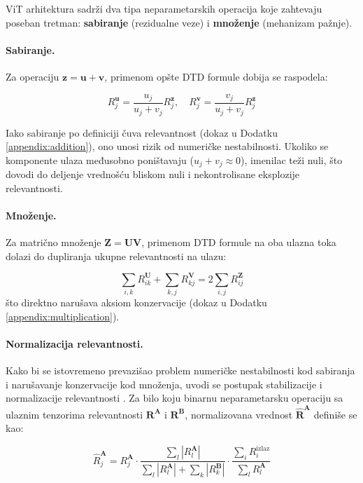 ViT arhitektura sadrži dva tipa neparametarskih operacija koje zahtevaju poseban tretman: \textbf{sabiranje} (rezidualne veze) i \textbf{množenje} (mehanizam pažnje).

\paragraph{Sabiranje.} Za operaciju $\mathbf{z} = \mathbf{u} + \mathbf{v}$, primenom opšte DTD formule dobija se raspodela:

\begin{equation}
    \label{eq:addition}
    R_j^{\mathbf{u}} = \frac{u_j}{u_j + v_j} R_j^{\mathbf{z}}, \quad 
    R_j^{\mathbf{v}} = \frac{v_j}{u_j + v_j} R_j^{\mathbf{z}}
\end{equation}

Iako sabiranje po definiciji čuva relevantnost (dokaz u Dodatku \ref{appendix:addition}), ono unosi rizik od numeričke nestabilnosti. Ukoliko se komponente ulaza međusobno poništavaju ($u_j + v_j \approx 0$), imenilac teži nuli, što dovodi do deljenje vrednošću bliskom nuli i nekontrolisane eksplozije relevantnosti.

\paragraph{Množenje.} Za matrično množenje $\mathbf{Z} = \mathbf{U}\mathbf{V}$, primenom DTD formule na oba ulazna toka dolazi do dupliranja ukupne relevantnosti na ulazu:

\begin{equation}
    \sum_{i,k} R_{ik}^{\mathbf{U}} + \sum_{k,j} R_{kj}^{\mathbf{V}} = 2 \sum_{i,j} R_{ij}^{\mathbf{Z}}
\end{equation}
što direktno narušava aksiom konzervacije (dokaz u Dodatku \ref{appendix:multiplication}).

\paragraph{Normalizacija relevantnosti.} Kako bi se istovremeno prevazišao problem numeričke nestabilnosti kod sabiranja i narušavanje konzervacije kod množenja, uvodi se postupak stabilizacije i normalizacije relevantnosti \cite{chefer2021transformer}. Za bilo koju binarnu neparametarsku operaciju sa ulaznim tenzorima relevantnosti $\mathbf{R}^{\mathbf{A}}$ i $\mathbf{R}^{\mathbf{B}}$, normalizovana vrednost $\hat{\mathbf{R}}^{\mathbf{A}}$ definiše se kao:

\begin{equation}
    \hat{R}_j^{\mathbf{A}} = R_j^{\mathbf{A}} \cdot \frac{\sum_l |R_l^{\mathbf{A}}|}{\sum_l |R_l^{\mathbf{A}}| + \sum_k |R_k^{\mathbf{B}}|} \cdot \frac{\sum_i R_i^{\text{izlaz}}}{\sum_l R_l^{\mathbf{A}}}
    \label{eq:normalized}
\end{equation}

